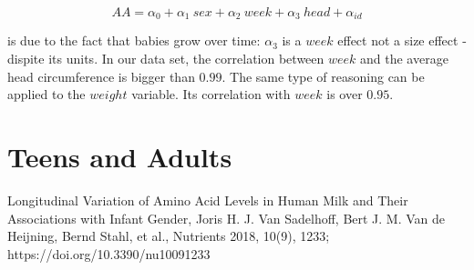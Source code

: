 \documentclass[12pt]{article}
\begin{document}
\begin{equation*}
  AA = \alpha_0 + \alpha_1 \ sex + \alpha_2 \ week + \alpha_3 \ head + \alpha_{id}
\end{equation*}

is due to the fact that babies grow over time: $\alpha_3$ is a $week$ effect not a size effect - dispite its units. In our data set, the correlation between $week$ and the average head circumference is bigger than $0.99$. The same type of reasoning can be applied to the $weight$ variable. Its correlation with $week$ is over $0.95$.


\section{Teens and Adults}



\newpage



\begin{thebibliography}{1}

 Longitudinal Variation of Amino Acid Levels in Human Milk and Their Associations with Infant Gender, Joris H. J. Van Sadelhoff, Bert J. M. Van de Heijning, Bernd Stahl, et al., Nutrients 2018, 10(9), 1233; https://doi.org/10.3390/nu10091233


\end{thebibliography}
\end{document}
